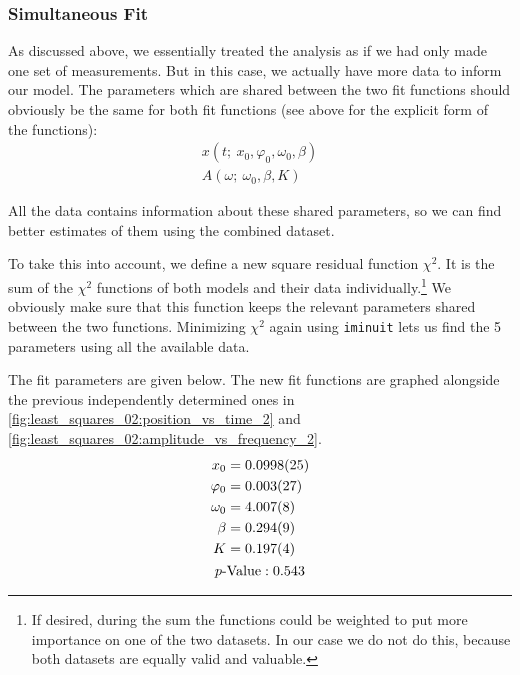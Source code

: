 
\subsubsection{Simultaneous Fit}

As discussed above, we essentially treated the analysis as if we had only made one set of measurements. But in this case, we actually have more data to inform our model. The parameters which are shared between the two fit functions should obviously be the same for both fit functions (see above for the explicit form of the functions):
\begin{gather}
    x(t ; \ x_0, \varphi_0, \omega_0, \beta) \\
    A(\omega ; \ \omega_0, \beta, K)
\end{gather}

All the data contains information about these shared parameters, so we can find better estimates of them using the combined dataset.

To take this into account, we define a new square residual function \( \chi^2 \). It is the sum of the \( \chi^2 \) functions of both models and their data individually.\footnote{If desired, during the sum the functions could be weighted to put more importance on one of the two datasets. In our case we do not do this, because both datasets are equally valid and valuable.} We obviously make sure that this function keeps the relevant parameters shared between the two functions. Minimizing \( \chi^2 \) again using \verb|iminuit| lets us find the \num{5} parameters using all the available data.

The fit parameters are given below. The new fit functions are graphed alongside the previous independently determined ones in \autoref{fig:least_squares_02:position_vs_time_2} and \autoref{fig:least_squares_02:amplitude_vs_frequency_2}.
\begin{gather}
    \begin{aligned}
        x_0 &= \num{0.0998 \pm 0.0025} \\
        \varphi_0 &= \num{0.003 \pm 0.027} \\
        \omega_0 &= \num{4.007 \pm 0.008} \\
        \beta &= \num{0.294 \pm 0.009} \\
        K &= \num{0.197 \pm 0.004}
    \end{aligned} \\
    p \text{-Value}: \num{0.543} \\
\end{gather}

